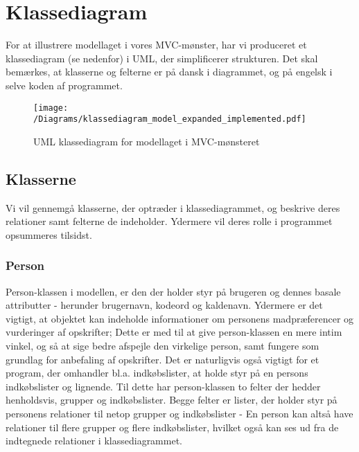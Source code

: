\chapter{Klassediagram}
For at illustrere modellaget i vores MVC-mønster, har vi produceret et klassediagram (se  nedenfor) i UML, der simplificerer strukturen. 
Det skal bemærkes, at klasserne og felterne er på dansk i diagrammet, og på engelsk i selve koden af programmet. 

\begin{figure}[H]
\centering
\texttt{[image: /Diagrams/klassediagram\_model\_expanded\_implemented.pdf]}
\caption{UML klassediagram for modellaget i MVC-mønsteret}\label{diagram:klassediagram}
\end{figure}

\section{Klasserne}
Vi vil gennemgå klasserne, der optræder i klassediagrammet, og beskrive deres relationer samt felterne de indeholder. Ydermere vil deres rolle i programmet opsummeres tilsidst.

\subsection{Person}
Person-klassen i modellen, er den der holder styr på brugeren og dennes basale attributter - herunder brugernavn, kodeord og kaldenavn. 
Ydermere er det vigtigt, at objektet kan indeholde informationer om personens madpræferencer og vurderinger af opskrifter; Dette er med til at give person-klassen en mere intim vinkel, og så at sige bedre afspejle den virkelige person, samt fungere som grundlag for anbefaling af opskrifter. 
Det er naturligvis også vigtigt for et program, der omhandler bl.a. indkøbslister, at holde styr på en persons indkøbslister og lignende. 
Til dette har person-klassen to felter der hedder henholdsvis, grupper og indkøbslister. 
Begge felter er lister, der holder styr på personens relationer til netop grupper og indkøbslister - En person kan altså have relationer til flere grupper og flere indkøbslister, hvilket også kan ses ud fra de indtegnede relationer i klassediagrammet.


